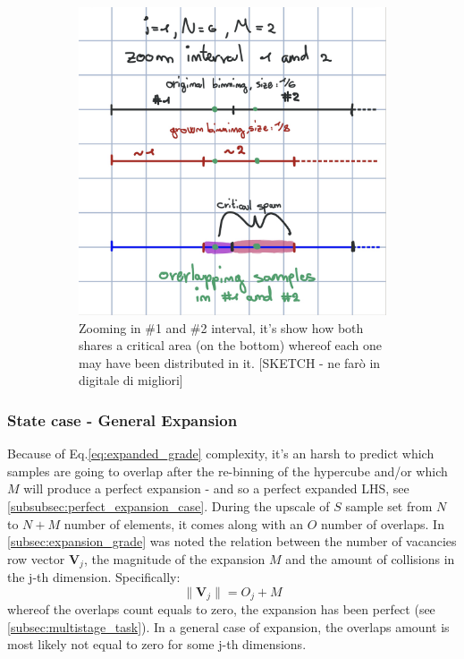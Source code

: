\documentclass[12pt]{article}
\newcommand{\meqref}[1]{Eq.\ref{#1}}
\newcommand{\midcaption}[1]{
    \captionsetup{justification=centering}
    \caption{#1}
}
\begin{document}
\begin{figure}[h]
\begin{subfigure}[b]{0.45\textwidth}
{        	\includegraphics[width=\textwidth]{src/imgs/critical_span_zoom.jpg}
        	\caption{Zooming in \#1 and \#2 interval, it's show how both shares a critical area (on the bottom) whereof each one may have been distributed in it. [SKETCH - ne farò in digitale di migliori]}
        	\label{fig:critical_span2}
        }
    \end{subfigure}
    \midcaption{ }
    \label{fig:critical_span}
\end{figure}

\subsubsection{State case - General Expansion}
\label{subsubsec:general_expansion_case}
Because of \meqref{eq:expanded_grade} complexity, it's an harsh to predict which samples are going to overlap after the re-binning of the hypercube and/or which $M$ will produce a perfect expansion - and so a perfect expanded LHS, see \cref{subsubsec:perfect_expansion_case}.
During the upscale of $S$ sample set from $N$ to $N+M$ number of elements, it comes along with an $O$ number of overlaps.
In \cref{subsec:expansion_grade} was noted the relation between the number of vacancies row vector $\textbf{V}_j$, the magnitude of the expansion $M$ and the amount of collisions in the j-th dimension. Specifically:
\begin{equation}
\label{eq:vjojm}	%
\parallel \textbf{V}_j \parallel = O_j + M
\end{equation}
whereof the overlaps count equals to zero, the expansion has been perfect (see \cref{subsec:multistage_task}). In a general case of expansion, the overlaps amount is most likely not equal to zero for some j-th dimensions.
\end{document}

